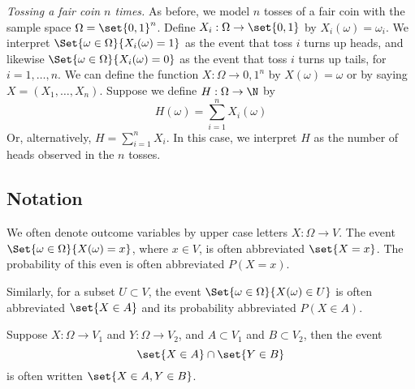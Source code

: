 \textit{Tossing a fair coin $n$ times.}
As before, we model $n$ tosses of a fair coin with the sample space $\Omega  = \set{0,1}^n$.
Define $X_i: \Omega  \to \set{0,1}$ by $X_i(\omega ) = \omega _i$.
We interpret $\Set{\omega  \in \Omega }{X_i(\omega ) = 1}$ as the event that toss $i$ turns up heads, and likewise $\Set{\omega \in \Omega }{X_i(\omega ) = 0}$ as the event that toss $i$ turns up tails, for $i = 1, \dots , n$.
We can define the function $X: \Omega  \to {0,1}^n$ by $X(\omega ) = \omega $ or by saying $X = (X_1, \dots , X_n)$.
Suppose we define $H: \Omega  \to \N  $ by
\[
H(\omega ) = \sum_{i= 1}^{n} X_i(\omega )
\]
Or, alternatively, $H = \sum_{i = 1}^{n} X_i$.
In this case, we interpret $H$ as the number of heads observed in the $n$ tosses.


\subsection*{Notation}

We often denote outcome variables by upper case letters $X: \Omega  \to V$.
The event $\Set{\omega  \in \Omega }{X(\omega ) = x}$, where $x \in V$, is often abbreviated $\set{X = x}$.
The probability of this even is often abbreviated $P(X = x)$.

Similarly, for a subset $U \subset V$, the event $\Set{\omega \in \Omega }{X(\omega ) \in U}$ is often abbreviated $\set{X \in A}$ and its probability abbreviated $P(X \in A)$.

Suppose $X: \Omega  \to V_1$ and $Y: \Omega  \to V_2$, and $A \subset V_1$ and $B \subset V_2$, then the event
\[
\set{X \in A} \cap  \set{Y \in B}
\]
is often written $\set{X \in A, Y \in B}$.

\blankpage